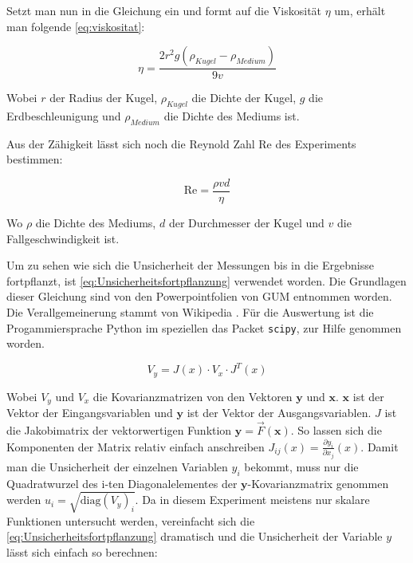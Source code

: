 \documentclass[11pt,ngerman]{scrartcl}
\begin{document}
Setzt man nun in die Gleichung ein und formt auf die Viskosität $\eta$ um, 
erhält man folgende \autoref{eq:viskositat}:

\begin{equation}
    \eta = \frac{2r^2 g (\rho_{Kugel}-\rho_{Medium})}{9v} \label{eq:viskositat}
\end{equation}

Wobei $r$ der Radius der Kugel, $\rho_{Kugel}$ die Dichte der Kugel, $g$ die
Erdbeschleunigung und $\rho_{Medium}$ die Dichte des Mediums ist.

Aus der Zähigkeit lässt sich noch die Reynold Zahl Re des Experiments bestimmen:

\begin{equation}
    \text{Re} = \frac{\rho vd}{\eta} 
\end{equation}

Wo $\rho$ die Dichte des Mediums, $d$ der Durchmesser der Kugel und
$v$ die Fallgeschwindigkeit ist.

Um zu sehen wie sich die Unsicherheit der Messungen bis in die Ergebnisse 
fortpflanzt, ist \autoref{eq:Unsicherheitsfortpflanzung} verwendet worden.
Die Grundlagen dieser Gleichung sind von den Powerpointfolien von 
GUM entnommen worden.\cite{WolfgangKessel2004} Die Verallgemeinerung stammt von Wikipedia \cite{2020Fehler}.
Für die Auswertung ist die Progammiersprache Python im speziellen das 
Packet \verb#scipy#, zur Hilfe genommen worden.

\begin{equation}
    \label{eq:Unsicherheitsfortpflanzung}
    V_y = J(x) \cdot V_x \cdot J^{T}(x)
\end{equation}

Wobei $V_y$ und $V_x$ die Kovarianzmatrizen von den Vektoren $\bm{y}$ und $\bm{x}$.
$\bm{x}$ ist der Vektor der Eingangsvariablen und $\bm{y}$ ist der Vektor der Ausgangsvariablen.
$J$ ist die Jakobimatrix der vektorwertigen Funktion $\bm{y} = \vec{F}(\bm{x})$.
So lassen sich die Komponenten der Matrix relativ einfach anschreiben $J_{ij}(x) = \frac{\partial{y_i}}{\partial{x_j}}(x)$.
Damit man die Unsicherheit der einzelnen Variablen $y_i$ bekommt, muss nur die Quadratwurzel des i-ten Diagonalelementes der 
$\bm{y}$-Kovarianzmatrix genommen werden $u_i= \sqrt{\mathrm{diag}(V_y)_i}$.
Da in diesem Experiment meistens nur skalare Funktionen untersucht werden, vereinfacht
sich die \autoref{eq:Unsicherheitsfortpflanzung} dramatisch und die Unsicherheit
der Variable $y$ lässt sich einfach so berechnen:
\end{document}
